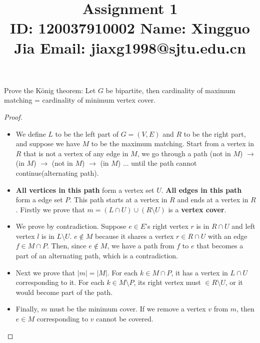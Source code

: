 \documentclass{article}
\title{{\bf Assignment 1} \\ {\large ID: 120037910002 } {\large Name: Xingguo Jia } {\large Email: jiaxg1998@sjtu.edu.cn}}
\author{}
\date{}
\newcounter{exercise}
\newcommand{\<}{
    \langle}
\renewcommand{\>}{
    \rangle}
\begin{document}
\maketitle


{\large





\begin{exercise}
Prove the K\"onig theorem: Let $G$ be bipartite, then cardinality of maximum matching = cardinality of minimum vertex cover.

\end{exercise}
\begin{proof} 
    \leavevmode\newline
\begin{itemize}

\item We define $L$ to be the left part of $G=(V,E)$ and $R$ to be the right part, and suppose we have $M$ to be the maximum matching. Start from a vertex in $R$ that is not a vertex of any edge in $M$, we go through a path (not in $M$) $\rightarrow$ (in $M$) $\rightarrow$  (not in $M$) $\rightarrow$ (in $M$) ... until the path cannot continue(alternating path). 

\item \textbf{All vertices in this path } form a vertex set $U$. \textbf{All edges in this path} form a edge set $P$. This path starts at a vertex in $R$ and ends at a vertex in $R$. Firstly we prove that $m=(L \cap U) \cup (R \setminus U)$ is a \textbf{vertex cover}.

\item We prove by contradiction. Suppose $e \in E$'s right vertex $r$ is in $R\cap U$ and left vertex $l$ is in $L\setminus U$. $e\notin M$ because it shares a vertex $r\in R\cap U$ with an edge $f\in M \cap P$. Then, since $e \notin M$, we have a path from $f$ to $e$ that becomes a part of an alternating path, which is a contradiction.

\item Next we prove that $|m| = |M|$. For each $k \in M \cap P$, it has a vertex in $L\cap U$ corresponding to it. For each $k \in M \setminus P$, its right vertex must $\in R \setminus U$, or it would become part of the path.

\item Finally, $m$ must be the minimum cover. If we remove a vertex $v$ from $m$, then $e \in M$ corresponding to $v$ cannot be covered. 
\end{itemize}
\end{proof}


}
\end{document}
